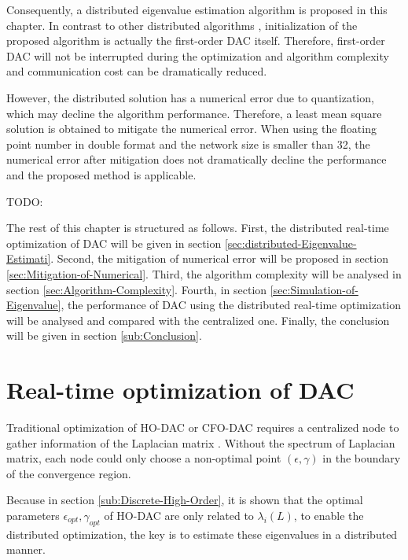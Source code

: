 Consequently, a distributed eigenvalue estimation algorithm is proposed
in this chapter. In contrast to other distributed algorithms \cite{Kempe2008}\cite{Franceschelli2009}\cite{Yang2010},
initialization of the proposed algorithm is actually the first-order
DAC itself. Therefore, first-order DAC will not be interrupted during
the optimization and algorithm complexity and communication cost can
be dramatically reduced.  

However, the distributed solution has a numerical error due to quantization,
which may decline the algorithm performance. Therefore, a least mean
square solution is obtained to mitigate the numerical error. When
using the floating point number in double format and the network size
is smaller than 32, the numerical error after mitigation does not
dramatically decline the performance and the proposed method is applicable. 



TODO:

The rest of this chapter is structured as follows. First,  the distributed
real-time optimization of DAC will be given in section \ref{sec:distributed-Eigenvalue-Estimati}.
Second, the mitigation of numerical error  will be proposed in section
\ref{sec:Mitigation-of-Numerical}. Third, the algorithm complexity
will be analysed in section \ref{sec:Algorithm-Complexity}. Fourth,
in section \ref{sec:Simulation-of-Eigenvalue}, the performance of
DAC using the distributed real-time optimization  will be  analysed
and compared with the centralized one. Finally, the conclusion will
be given in section \ref{sub:Conclusion}.


\section{\label{sec:distributed-Eigenvalue-Estimati}Real-time optimization
of DAC }

Traditional optimization of HO-DAC or CFO-DAC requires a centralized
node to gather information of the Laplacian matrix \cite{Xiong2010}.
Without the spectrum of Laplacian matrix, each node could only choose
a non-optimal point $\left(\epsilon,\gamma\right)$ in the boundary
of  the convergence region.

Because in section \ref{sub:Discrete-High-Order}, it is shown that
the optimal parameters $\epsilon_{opt},\gamma_{opt}$ of HO-DAC are
only related to $\lambda_{i}\left(L\right)$, to enable the distributed
optimization, the key is to estimate these eigenvalues in a distributed
manner.  

